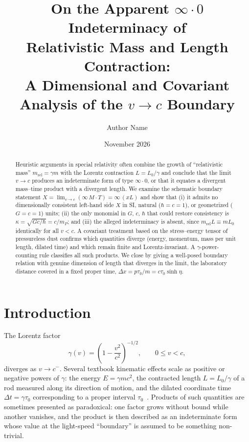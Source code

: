 \documentclass[11pt,a4paper]{article}
\title{\textbf{On the Apparent $\infty\cdot 0$ Indeterminacy of\\
Relativistic Mass and Length Contraction:\\
A Dimensional and Covariant Analysis of the $v\to c$ Boundary}}
\author{Author Name}
\affil{Affiliation}
\date{November 2026}
\theoremstyle{definition}
\theoremstyle{remark}
\newcommand{\mrel}{m_{\mathrm{rel}}}
\begin{document}
\maketitle

\begin{abstract}
\noindent
Heuristic arguments in special relativity often combine the growth of
``relativistic mass'' $\mrel=\gamma m$ with the Lorentz contraction
$L=L_0/\gamma$ and conclude that the limit $v\to c$ produces an
indeterminate form of type $\infty\cdot 0$, or that it equates a divergent
mass--time product with a divergent length. We examine the schematic boundary
statement
$X=\lim_{v\to c}(\infty\,M\cdot T)=\infty\,(xL)$
and show that (i) it admits no dimensionally consistent left-hand side $X$ in
SI, natural ($\hbar=c=1$), or geometrized ($G=c=1$) units; (ii) the only
monomial in $G$, $c$, $\hbar$ that could restore consistency is
$\kappa=\sqrt{Gc/\hbar}=c/m_P$; and (iii) the alleged indeterminacy is absent,
since $\mrel L\equiv mL_0$ identically for all $v<c$. A covariant treatment
based on the stress--energy tensor of pressureless dust confirms which
quantities diverge (energy, momentum, mass per unit length, dilated time) and
which remain finite and Lorentz-invariant. A $\gamma$-power-counting rule
classifies all such products. We close by giving a well-posed boundary
relation with genuine dimension of length that diverges in the limit, the
laboratory distance covered in a fixed proper time,
$\Delta x=p\tau_0/m=c\tau_0\sinh\eta$.
\end{abstract}

\section{Introduction}\label{sec:intro}

The Lorentz factor
\begin{equation}
  \gamma(v)=\left(1-\frac{v^2}{c^2}\right)^{-1/2}, \qquad 0\le v<c,
  \label{eq:gamma}
\end{equation}
diverges as $v\to c^-$. Several textbook kinematic effects scale as positive
or negative powers of $\gamma$: the energy $E=\gamma mc^2$, the contracted
length $L=L_0/\gamma$ of a rod measured along its direction of motion, and the
dilated coordinate time $\Delta t=\gamma\tau_0$ corresponding to a proper
interval $\tau_0$~\cite{Einstein1905,TaylorWheeler,Rindler}. Products of such
quantities are sometimes presented as paradoxical: one factor grows without
bound while another vanishes, and the product is then described as an
indeterminate form whose value at the light-speed ``boundary'' is assumed to
be something non-trivial.
\end{document}
